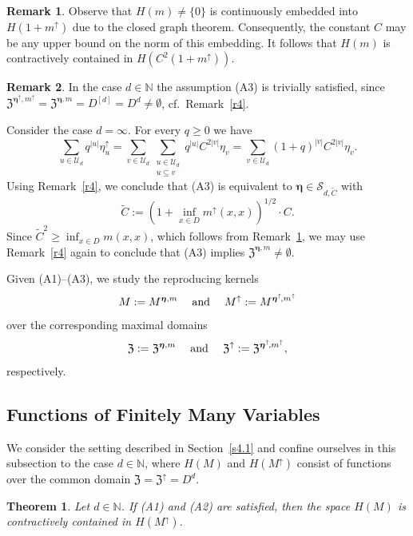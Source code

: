 \documentclass{article}
\newcommand{\N}  {{\mathbb N}}
\newcommand{\be}{{\boldsymbol{\eta}}}
\newcommand{\Z}{{\mathfrak Z}}
\newcommand{\U}  {\mathcal{U}}
\newcommand{\SSS}{\mathcal{S}}
\newcommand{\up}{\uparrow}
\theoremstyle{plain}
\newtheorem{theo}{Theorem}
\theoremstyle{definition}
\newtheorem{rem}{Remark}
\begin{document}
\begin{rem}\label{r5}
Observe that $H(m) \neq \{0\}$ is
continuously embedded into $H(1+m^\up)$ 
due to the closed graph theorem.
Consequently, the constant $C$ may be any upper bound on 
the norm of this embedding. It follows that
$H(m)$ is contractively contained in $H(C^2(1+m^\up))$.
\end{rem}


\begin{rem}\label{r6}
In the case $d \in \N$ the assumption (A3) is trivially satisfied,
since $\Z^{\be^{\up},m^{\up}} = \Z^{\be,m} = D^{[d]} = D^d \neq 
\emptyset$, cf.~Remark~\ref{r4}.

Consider the case $d = \infty$. For every $q \geq 0$ we have
\[
\sum_{u \in \U_d} q^{|u|} \eta_u^\up =
\sum_{v \in \U_d} \sum_{\substack{u \in \U_d \\ u \subseteq v}}
q^{|u|} C^{2|v|} \eta_v =
\sum_{v \in \U_d} (1+q)^{|v|} C^{2|v|} \eta_v.
\]
Using Remark~\ref{r4}, we conclude that (A3) is equivalent to
$\be \in \SSS_{d,\widetilde{C}}$ with
\[ 
\widetilde{C} := (1+ \inf_{x \in D} m^\up(x,x) )^{1/2} \cdot C.
\]
Since $\widetilde{C}^2 \geq \inf_{x \in D} m(x,x)$, which 
follows from
Remark~\ref{r5}, we may use Remark~\ref{r4} again to conclude that
(A3) implies $\Z^{\be,m} \neq \emptyset$.
\end{rem}

Given (A1)--(A3), we study the reproducing kernels 
\[
M := M^{\be,m}
\hspace{3ex}\text{and}\hspace{3ex}
M^\up := M^{\be^\up\!,m^\up}
\]
over the corresponding maximal domains  
\[
\Z := \Z^{\be,m}
\hspace{3ex}\text{and}\hspace{3ex}
\Z^\up := \Z^{\be^\up\!,m^\up},
\]
respectively. 


\subsection{Functions of Finitely Many Variables}
\label{Subsec:Finite_Variables_FSE}

We consider the setting described in Section~\ref{s4.1}
and confine ourselves in this subsection to 
the case $d\in \N$, where $H(M)$ and 
$H(M^{\up})$ consist of functions over the common 
domain $\Z = \Z^{\up} = D^d$.

\begin{theo}\label{Lemma1}
Let $d \in \N$. If {\rm (A1)} and {\rm (A2)} are satisfied, then
the space $H(M)$ is contractively contained in $H(M^{\up})$.
\end{theo}
\end{document}
